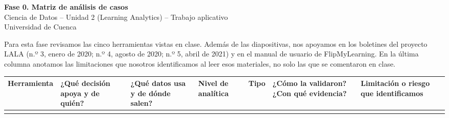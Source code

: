 \documentclass[10pt]{article}
\begin{document}
\begin{center}
{\Large\bfseries Fase 0. Matriz de análisis de casos}\\[2pt]
Ciencia de Datos -- Unidad 2 (Learning Analytics) -- Trabajo aplicativo\\
Universidad de Cuenca
\end{center}

Para esta fase revisamos las cinco herramientas vistas en clase. Además de las diapositivas, nos apoyamos en los boletines del proyecto LALA (n.º 3, enero de 2020; n.º 4, agosto de 2020; n.º 5, abril de 2021) y en el manual de usuario de FlipMyLearning. En la última columna anotamos las limitaciones que nosotros identificamos al leer esos materiales, no solo las que se comentaron en clase.

{\footnotesize
\begin{longtable}{P{2.2cm} P{3.4cm} P{3.6cm} P{2.7cm} P{2.2cm} P{4.3cm} P{5.0cm}}
\toprule
\textbf{Herramienta} & \textbf{¿Qué decisión apoya y de quién?} & \textbf{¿Qué datos usa y de dónde salen?} & \textbf{Nivel de analítica} & \textbf{Tipo} & \textbf{¿Cómo la validaron? ¿Con qué evidencia?} & \textbf{Limitación o riesgo que identificamos}\\
\midrule
\endhead
\bottomrule
\endfoot


\end{longtable}}
\end{document}
